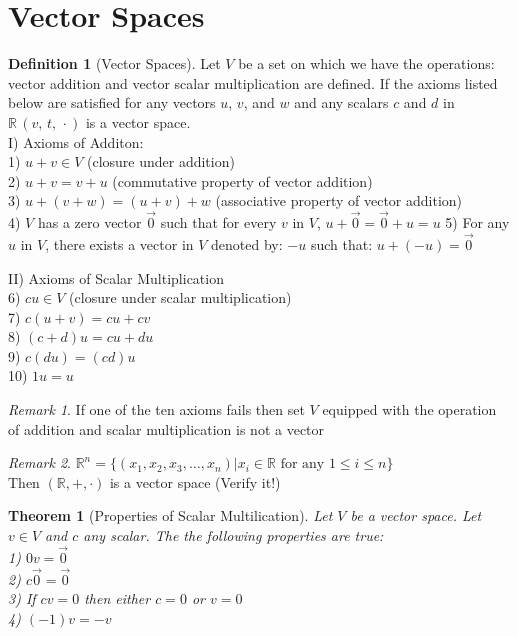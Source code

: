 \documentclass{jhwhw}
\newtheorem{theorem}{Theorem}
\theoremstyle{definition}
\newtheorem{definition}{Definition}
\theoremstyle{remark}
\newtheorem*{remark}{Remark}
\theoremstyle{example}
\begin{document}
\section{Vector Spaces}
\begin{definition}[Vector Spaces] Let \(V\) be a set on which we have the operations: vector addition and vector scalar multiplication are defined. If the axioms listed below are satisfied for any
vectors \(u\), \(v\), and \(w\) and any scalars \(c\) and \(d\) in \(\mathbb{R} \, (v, \, t, \, \cdot)\) is a vector space.\\
I) Axioms of Additon:\\
1) \(u + v \in V\) (closure under addition)\\
2) \(u + v = v + u\) (commutative property of vector addition)\\
3) \(u+(v+w) = (u+v)+w\) (associative property of vector addition)\\
4) \(V\) has a zero vector \(\vec{0}\) such that for every \(v\) in \(V\), \(u + \vec{0} = \vec{0} + u = u\)
5) For any \(u\) in \(V\), there exists a vector in \(V\) denoted by: \(-u\) such that: \(u+(-u)=\vec{0}\)

II) Axioms of Scalar Multiplication\\
6) \(cu \in V\) (closure under scalar multiplication)\\
7) \(c(u + v) = cu + cv\)\\
8) \((c+d)u = cu + du\)\\
9) \(c(du) = (cd)u\)\\
10) \(1u = u\)
\end{definition}
\begin{remark} If one of the ten axioms fails then set \(V\) equipped with the operation of addition and scalar multiplication is not a vector\end{remark}
\begin{remark} \(\mathbb{R}^n = \{(x_1, x_2, x_3, \ldots, x_n) | x_i \in \mathbb{R} \text{ for any } 1 \leq i \leq n\} \)\\
Then \((\mathbb{R}, +, \cdot)\) is a vector space (Verify it!) \end{remark}
\begin{theorem}[Properties of Scalar Multilication] Let \(V\) be a vector space. Let \(v \in V\) and \(c\) any scalar. The the following properties are true:\\
1) \(0v = \vec{0}\)\\
2) \(c \vec{0} = \vec{0}\)\\
3) If \(cv = 0\) then either \(c = 0\) or \(v = 0\)\\
4) \((-1)v = -v\) \end{theorem}
\end{document}
